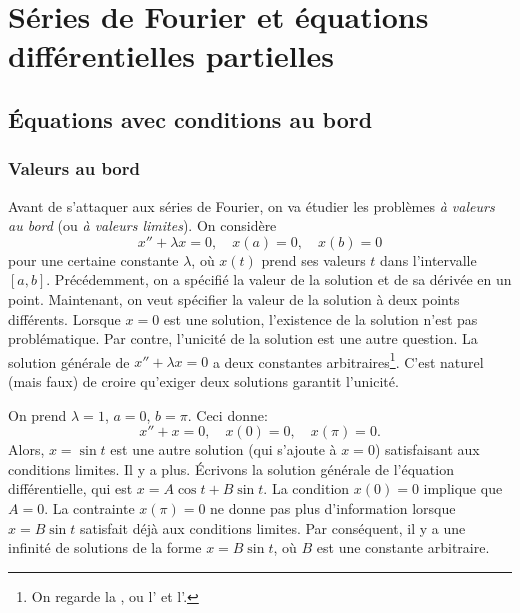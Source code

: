 \chapter{Séries de Fourier et équations différentielles partielles} \label{FS:chapter}


\section{Équations avec conditions au bord} \label{bvp:section}


\subsection{Valeurs au bord}

Avant de s'attaquer aux séries de Fourier, on va étudier les problèmes \emph{à valeurs au bord}
 (ou \emph{à valeurs limites}).  On considère
\begin{equation*}
x'' + \lambda x = 0, \quad x(a) = 0, \quad x(b) = 0
\end{equation*}
pour une certaine constante $\lambda$, où $x(t)$ prend ses valeurs  $t$ dans l'intervalle 
$[a,b]$.
Précédemment, on a spécifié la valeur de la solution et de sa dérivée en un point. Maintenant, on veut spécifier la valeur de la solution à deux points différents. Lorsque $x=0$ est une solution, l'existence de la solution n'est pas problématique. Par contre, l'unicité de la solution est une autre question. La solution générale de  $x'' + \lambda x = 0$ a deux constantes arbitraires\footnote{%
On regarde la , ou l' et l'.}.
C'est naturel (mais faux) de croire qu'exiger deux solutions garantit l'unicité. 

\begin{example}
On prend $\lambda = 1$,
$a=0$, $b=\pi$.  Ceci donne: 
\begin{equation*}
x'' + x = 0, \quad x(0) = 0, \quad x(\pi) = 0.
\end{equation*}
Alors, $x = \sin t$ est une autre solution  (qui s'ajoute à $x=0$) satisfaisant aux conditions limites. 
Il y a plus. Écrivons la solution générale de l'équation différentielle, qui est  $x= A \cos t + B \sin t$.
La condition $x(0) = 0$ implique que $A=0$.  La contrainte $x(\pi) = 0$ ne donne pas plus d'information lorsque $x = B \sin t$ satisfait déjà aux conditions limites. 
Par conséquent, il y a une infinité de solutions de la forme  $x = B \sin t$,
où $B$ est une constante arbitraire.  
\end{example}

